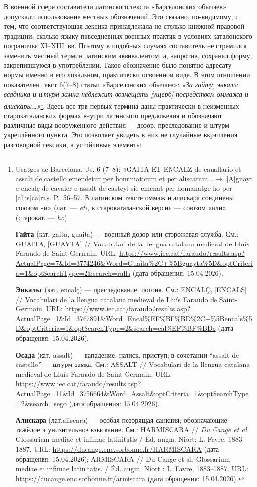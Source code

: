 В военной сфере составители латинского текста «Барселонских обычаев» допускали использование местных обозначений. Это связано, по-видимому, с тем, что соответствующая лексика принадлежала не столько книжной правовой традиции, сколько языку повседневных военных практик в условиях каталонского пограничья XI--XIII~вв. Поэтому в подобных случаях составитель не стремился заменить местный термин латинским эквивалентом, а, напротив, сохранял форму, закрепившуюся в употреблении. Такое обозначение было понятно адресату нормы именно в его локальном, практически освоенном виде. В этом отношении показателен текст 6(7--8) статьи «Барселонских обычаев»: \emph{«За гайту, энкаль}\emph{с}\emph{ всадника и штурм замка надлежит возмещать [ущерб] посредством оммажа и алискары}\emph{…»}\footnote{Usatges de Barcelona. Us. 6 (7--8): «GAITA ET ENCALZ de cauallario et assalt de castello emendetur per hominiaticum et per aliscaram...$\rightarrow$ [A]guayt e encalç de cavaler e assalt de casteyl sie emenat per homanatge ho per [al]is[ca]ra». P.~56--57. В латинском тексте оммаж и алискара соединены союзом «и» (лат. --- \emph{et}), в старокаталанской версии --- союзом «или» (старокат. --- \emph{ho}).\par \textbf{Гайта }(кат. gaita, guaita) --- военный дозор или сторожевая служба. См.: GUAITA, [GUAYTA] // Vocabulari de la llengua catalana medieval de Lluís Faraudo de Saint-Germain.  URL: \url{https://www.iec.cat/faraudo/results.asp?ActualPage=7&Id=3774246&Word=Guaita\%2C+\%5Bguayta\%5D&optCriteria=1&optSearchType=2&search=ralla} (дата обращения: 15.04.2026).\par \textbf{Энкальс} (кат. encalç) --- преследование, погоня. См.: ENCALÇ, [ENCALS] // Vocabulari de la llengua catalana medieval de Lluís Faraudo de Saint-Germain.  URL: \url{https://www.iec.cat/faraudo/results.asp?ActualPage=1&Id=3767891&Word=Encal\%EF\%BF\%BD\%2C+\%5Bencals\%5D&optCriteria=1&optSearchType=2&search=cal\%EF\%BF\%BDo} (дата обращения: 15.04.2026).\par \textbf{Осада }(кат. assalt) --- нападение, натиск, приступ; в сочетании “assalt de castello” --- штурм замка. См.: ASSALT // Vocabulari de la llengua catalana medieval de Lluís Faraudo de Saint-Germain.  URL: \url{https://www.iec.cat/faraudo/results.asp?ActualPage=11&Id=3756664&Word=Assalt&optCriteria=1&optSearchType=2&search=sego} (дата обращения: 15.04.2026).\par \textbf{Алискара} (лат.aliscara) --- особая позорящая санкция; обозначающие тяжёлое и унизительное взыскание. См.: HARMISCARA // \emph{Du Cange et al.} Glossarium mediae et infimae latinitatis / Éd. augm. Niort: L. Favre, 1883--1887. URL: \url{https://ducange.enc.sorbonne.fr/HARMISCARA} (дата обращения: 15.04.2026); ARMISCARA // Du Cange et al. Glossarium mediae et infimae latinitatis. / Éd. augm. Niort : L. Favre, 1883--1887. URL: \url{https://ducange.enc.sorbonne.fr/armiscara} (дата обращения: 15.04.2026).}. Здесь все три первых термина даны практически в неизменных старокаталанских формах внутри латинского предложения и обозначают различные виды вооружённого действия --- дозор, преследование и штурм укреплённого пункта. Это позволяет увидеть в них не случайные вкрапления разговорной лексики, а устойчивые элементы 